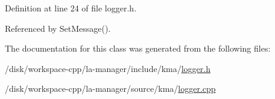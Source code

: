 Definition at line 24 of file logger.h.

Referenced by SetMessage().

The documentation for this class was generated from the following files:\begin{CompactItemize}
\item 
/disk/workspace-cpp/la-manager/include/kma/\hyperlink{logger_8h}{logger.h}\item 
/disk/workspace-cpp/la-manager/source/kma/\hyperlink{logger_8cpp}{logger.cpp}\end{CompactItemize}
